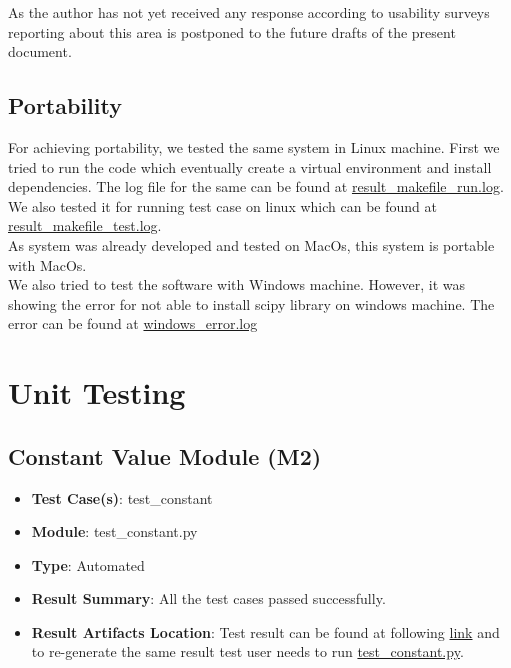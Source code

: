 \documentclass[12pt, titlepage]{article}
\begin{document}
    As the author has not yet received any response according to usability surveys reporting about this area is postponed to the future drafts of the present document. 


\subsection{Portability}

For achieving portability, we tested the same system in Linux machine. First we tried to run the code which eventually create a virtual environment and install dependencies. The log file for the same can be found at \href{https://github.com/DeeshaPatel/CAS-741-Solar-Cooker/blob/2ff9134d70eff6a26c63ebc68b9c41ecd9457917/test/Non%20Functional%20Requirement/portability/result_makefile_run.log}{result\_makefile\_run.log}. We also tested it for running test case on linux which can be found at \href{https://github.com/DeeshaPatel/CAS-741-Solar-Cooker/blob/2ff9134d70eff6a26c63ebc68b9c41ecd9457917/test/Non%20Functional%20Requirement/portability/result_makefile_test.log}{result\_makefile\_test.log}. \\ 

As system was already developed and tested on MacOs, this system is portable with MacOs. \\ 

We also tried to test the software with Windows machine. However, it was showing the error for not able to install scipy library on windows machine. The error can be found at \href{https://github.com/DeeshaPatel/CAS-741-Solar-Cooker/blob/1db49527fcbe83165d986f31da2804f1a6012454/test/Non%20Functional%20Requirement/portability/windows_error.log}{windows\_error.log} 


\section{Unit Testing}

\subsection{Constant Value Module (M2)} 
\begin{itemize}
    \item \textbf{Test Case(s)}: test\_constant
    \item \textbf{Module}: test\_constant.py
    \item \textbf{Type}: Automated 
    \item \textbf{Result Summary}: All the test cases passed successfully. 
    \item \textbf{Result Artifacts Location}: Test result can be found at following \href{https://github.com/DeeshaPatel/CAS-741-Solar-Cooker/blob/9a7ae69a1b005561bb8ac5d16c9275f5805ed72f/test/Unit%20test/result_constant.log}{link} and to re-generate the same result test user needs to run \href{https://github.com/DeeshaPatel/CAS-741-Solar-Cooker/blob/aa683cc4b92f631607346b8ae28d9ff73b78d420/src/testing/test_constant.py}{test\_constant.py}.  
\end{itemize}
\end{document}
